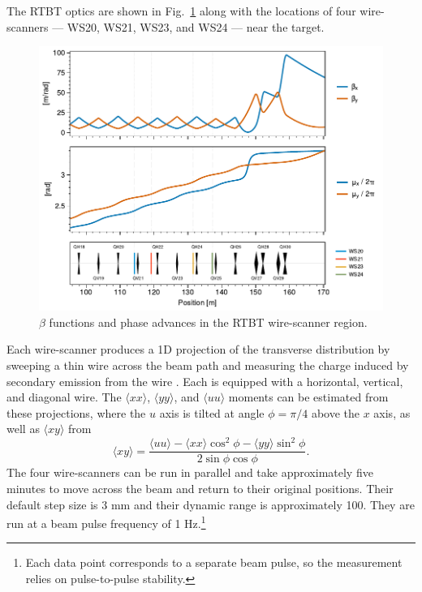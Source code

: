 The RTBT optics are shown in Fig.~\ref{fig:rtbt_optics} along with the locations of four wire-scanners — WS20, WS21, WS23, and WS24 — near the target.
%
\begin{figure}[!p]
    \includegraphics[width=\textwidth]{Images/chapter4/rtbt_optics.pdf}
    \caption{$\beta$ functions and phase advances in the RTBT wire-scanner region.}
    \label{fig:rtbt_optics}
\end{figure}
%
Each wire-scanner produces a 1D projection of the transverse distribution by sweeping a thin wire across the beam path and measuring the charge induced by secondary emission from the wire \cite{Henderson2014}. Each is equipped with a horizontal, vertical, and diagonal wire. The $\langle{xx}\rangle$, $\langle{yy}\rangle$, and $\langle{uu}\rangle$ moments can be estimated from these projections, where the $u$ axis is tilted at angle $\phi = \pi/4$ above the $x$ axis, as well as $\langle{xy}\rangle$ from
%
\begin{equation}
    \langle{xy}\rangle = \frac{\langle{uu}\rangle - \langle{xx}\rangle \cos^2\phi - \langle{yy}\rangle \sin^2\phi}{2\sin\phi\cos\phi}
    .
\end{equation}
%
The four wire-scanners can be run in parallel and take approximately five minutes to move across the beam and return to their original positions. Their default step size is 3 mm and their dynamic range is approximately 100. They are run at a beam pulse frequency of 1 Hz.\footnote{Each data point corresponds to a separate beam pulse, so the measurement relies on pulse-to-pulse stability.} 

